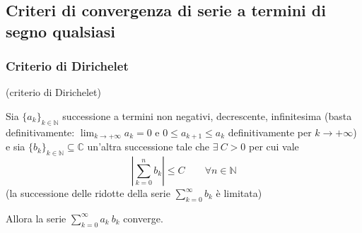 \subsection{Criteri di convergenza di serie a termini di segno qualsiasi}
\subsubsection{Criterio di Dirichelet}
\begin{theorem} (criterio di Dirichelet)
	
	Sia $\{a_k\}_{k \in \mathbb{N}}$ successione a termini non negativi, decrescente, infinitesima (basta definitivamente: $\lim_{k \rightarrow +\infty} a_k=0$ e $0\leq a_{k+1} \leq a_k$ definitivamente per $k \rightarrow +\infty$) e sia $\{b_k\}_{k \in \mathbb{N}} \subseteq \mathbb{C}$ un'altra successione tale che $\exists \ C>0$ per cui vale
	\begin{equation*}
		\left| \sum_{k=0}^{n} b_k \right| \leq C \qquad \forall n \in \mathbb{N}
	\end{equation*}
	(la successione delle ridotte della serie $\sum_{k=0}^{\infty} b_k$ è limitata)
	
	Allora la serie $\sum_{k=0}^{\infty} a_k \ b_k$ converge.
\end{theorem}


